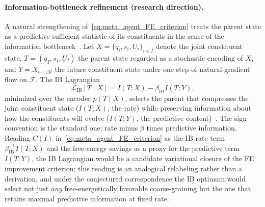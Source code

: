 \documentclass[11pt]{article}
\begin{document}
\paragraph{Information-bottleneck refinement (research direction).} A natural strengthening of~\eqref{eq:meta_agent_FE_criterion} treats the parent state as a predictive sufficient statistic of its constituents in the sense of the information bottleneck~\cite{tishby1999information}. Let $X = \{q_i, s_i, U_i\}_{i \in I}$ denote the joint constituent state, $T = (q_I, s_I, U_I)$ the parent state regarded as a stochastic encoding of $X$, and $Y = X_{t+\Delta t}$ the future constituent state under one step of natural-gradient flow on $\mathcal{F}$. The IB Lagrangian
\begin{equation}
\mathcal{L}_{\mathrm{IB}}[T \mid X] = I(T;X) - \beta_{\mathrm{IB}}I(T;Y),
\label{eq:meta_agent_IB}
\end{equation}
minimized over the encoder $p(T \mid X)$, selects the parent that compresses the joint constituent state ($I(T;X)$, the rate) while preserving information about how the constituents will evolve ($I(T;Y)$, the predictive content)~\cite{bialek2001predictability}. The sign convention is the standard one: rate minus $\beta$ times predictive information. Reading $C(I)$ in~\eqref{eq:meta_agent_FE_criterion} as the IB rate term $\beta_{\mathrm{IB}}^{-1}I(T;X)$ and the free-energy savings as a proxy for the predictive term $I(T;Y)$, the IB Lagrangian would be a candidate variational closure of the FE improvement criterion; this reading is an analogical relabeling rather than a derivation, and under the conjectured correspondence the IB optimum would select not just \emph{any} free-energetically favorable coarse-graining but the one that retains maximal predictive information at fixed rate.
\end{document}
